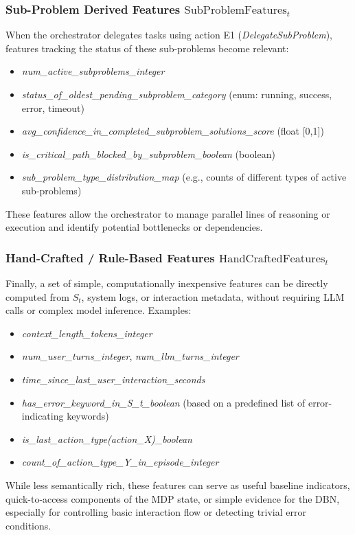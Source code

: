 \documentclass[11pt]{article}
\begin{document}
\subsubsection{Sub-Problem Derived Features $\text{SubProblemFeatures}_t$}
\label{sssec:subproblem_features}
When the orchestrator delegates tasks using action E1 (\emph{DelegateSubProblem}), features tracking the status of these sub-problems become relevant:
\begin{itemize}
    \item \emph{num_active_subproblems_integer}
    \item \emph{status_of_oldest_pending_subproblem_category} (enum: running, success, error, timeout)
    \item \emph{avg_confidence_in_completed_subproblem_solutions_score} (float [0,1])
    \item \emph{is_critical_path_blocked_by_subproblem_boolean} (boolean)
    \item \emph{sub_problem_type_distribution_map} (e.g., counts of different types of active sub-problems)
\end{itemize}
These features allow the orchestrator to manage parallel lines of reasoning or execution and identify potential bottlenecks or dependencies.

\subsubsection{Hand-Crafted / Rule-Based Features $\text{HandCraftedFeatures}_t$}
\label{sssec:handcrafted_features}
Finally, a set of simple, computationally inexpensive features can be directly computed from $S_t$, system logs, or interaction metadata, without requiring LLM calls or complex model inference. Examples:
\begin{itemize}
    \item \emph{context_length_tokens_integer}
    \item \emph{num_user_turns_integer}, \emph{num_llm_turns_integer}
    \item \emph{time_since_last_user_interaction_seconds}
    \item \emph{has_error_keyword_in_S_t_boolean} (based on a predefined list of error-indicating keywords)
    \item \emph{is_last_action_type(action_X)_boolean}
    \item \emph{count_of_action_type_Y_in_episode_integer}
\end{itemize}
While less semantically rich, these features can serve as useful baseline indicators, quick-to-access components of the MDP state, or simple evidence for the DBN, especially for controlling basic interaction flow or detecting trivial error conditions.
\end{document}
